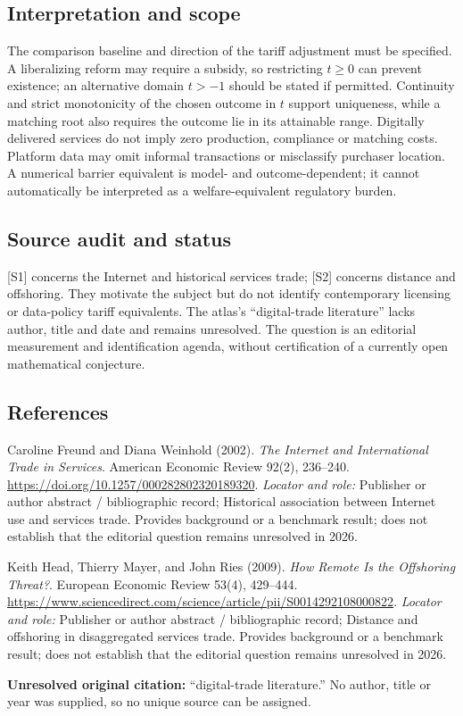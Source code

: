 \documentclass[11pt,a4paper]{article}
\begin{document}
\subsection*{Interpretation and scope}
The comparison baseline and direction of the tariff adjustment must be specified. A liberalizing reform may require a subsidy, so restricting $t\ge0$ can prevent existence; an alternative domain $t>-1$ should be stated if permitted. Continuity and strict monotonicity of the chosen outcome in $t$ support uniqueness, while a matching root also requires the outcome lie in its attainable range. Digitally delivered services do not imply zero production, compliance or matching costs. Platform data may omit informal transactions or misclassify purchaser location. A numerical barrier equivalent is model- and outcome-dependent; it cannot automatically be interpreted as a welfare-equivalent regulatory burden.

\subsection*{Source audit and status}
[S1] concerns the Internet and historical services trade; [S2] concerns distance and offshoring. They motivate the subject but do not identify contemporary licensing or data-policy tariff equivalents. The atlas’s ``digital-trade literature'' lacks author, title and date and remains unresolved. The question is an editorial measurement and identification agenda, without certification of a currently open mathematical conjecture.

\subsection*{References}

\begin{enumerate}[label={[S\arabic*]},leftmargin=*]

\item Caroline Freund and Diana Weinhold (2002). \emph{The Internet and International Trade in Services}. American Economic Review 92(2), 236–240. \url{https://doi.org/10.1257/000282802320189320}.
\textit{Locator and role:} Publisher or author abstract / bibliographic record; Historical association between Internet use and services trade. Provides background or a benchmark result; does not establish that the editorial question remains unresolved in 2026.

\item Keith Head, Thierry Mayer, and John Ries (2009). \emph{How Remote Is the Offshoring Threat?}. European Economic Review 53(4), 429–444. \url{https://www.sciencedirect.com/science/article/pii/S0014292108000822}.
\textit{Locator and role:} Publisher or author abstract / bibliographic record; Distance and offshoring in disaggregated services trade. Provides background or a benchmark result; does not establish that the editorial question remains unresolved in 2026.

\item \textbf{Unresolved original citation:} ``digital-trade literature.'' No author, title or year was supplied, so no unique source can be assigned.

\end{enumerate}
\end{document}
